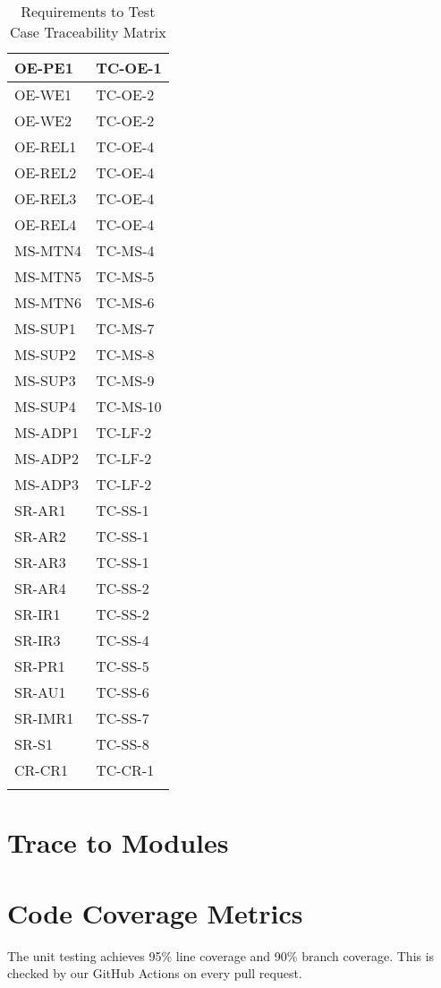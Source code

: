 \documentclass[12pt, titlepage]{article}
\begin{document}
\begin{longtable}{|l|l|}
  OE-PE1 & TC-OE-1 \\ \hline
  OE-WE1 & TC-OE-2 \\ \hline
  OE-WE2 & TC-OE-2 \\ \hline
  OE-REL1 & TC-OE-4 \\ \hline
  OE-REL2 & TC-OE-4 \\ \hline
  OE-REL3 & TC-OE-4 \\ \hline
  OE-REL4 & TC-OE-4 \\ \hline
  MS-MTN4 & TC-MS-4 \\ \hline
  MS-MTN5 & TC-MS-5 \\ \hline
  MS-MTN6 & TC-MS-6 \\ \hline
  MS-SUP1 & TC-MS-7 \\ \hline
  MS-SUP2 & TC-MS-8 \\ \hline
  MS-SUP3 & TC-MS-9 \\ \hline
  MS-SUP4 & TC-MS-10 \\ \hline
  MS-ADP1 & TC-LF-2 \\ \hline
  MS-ADP2 & TC-LF-2 \\ \hline
  MS-ADP3 & TC-LF-2 \\ \hline
  SR-AR1 & TC-SS-1 \\ \hline
  SR-AR2 & TC-SS-1 \\ \hline
  SR-AR3 & TC-SS-1 \\ \hline
  SR-AR4 & TC-SS-2 \\ \hline
  SR-IR1 & TC-SS-2 \\ \hline
  SR-IR3 & TC-SS-4 \\ \hline
  SR-PR1 & TC-SS-5\\ \hline
  SR-AU1 & TC-SS-6 \\ \hline
  SR-IMR1 & TC-SS-7 \\ \hline
  SR-S1 & TC-SS-8 \\ \hline
  CR-CR1 & TC-CR-1 \\ \hline
  \caption{Requirements to Test Case Traceability Matrix}
\end{longtable}

\section{Trace to Modules}

\section{Code Coverage Metrics}

The unit testing achieves 95\% line coverage and 90\% branch
coverage. This is checked by our GitHub Actions on every pull request.
\end{document}
